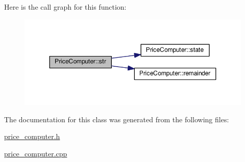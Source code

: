 Here is the call graph for this function\-:\nopagebreak
\begin{figure}[H]
\begin{center}
\leavevmode
\includegraphics[width=348pt]{classPriceComputer_ac6a85d7316a174de19a4eccdffd91ae3_cgraph}
\end{center}
\end{figure}




The documentation for this class was generated from the following files\-:\begin{DoxyCompactItemize}
\item 
\hyperlink{price__computer_8h}{price\-\_\-computer.\-h}\item 
\hyperlink{price__computer_8cpp}{price\-\_\-computer.\-cpp}\end{DoxyCompactItemize}
